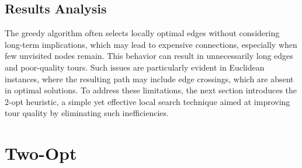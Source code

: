 \subsection{Results Analysis}

The greedy algorithm often selects locally optimal edges without considering long-term implications, which may lead to expensive connections, 
especially when few unvisited nodes remain. This behavior can result in unnecessarily long edges and poor-quality tours. Such issues are particularly 
evident in Euclidean instances, where the resulting path may include edge crossings, which are absent in optimal solutions. To address these limitations, 
the next section introduces the 2-opt heuristic, a simple yet effective local search technique aimed at improving tour quality by eliminating such inefficiencies.

\section{Two-Opt}
